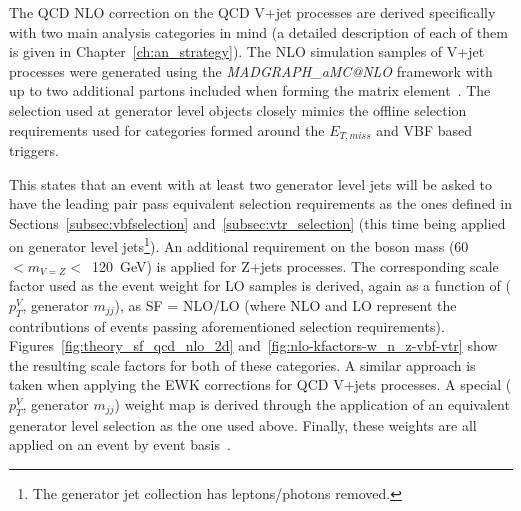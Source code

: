 \hspace{10pt} The QCD NLO correction on the QCD V+jet processes are derived specifically with two main analysis categories in mind (a detailed description of each of them is given in Chapter~\ref{ch:an_strategy}). The NLO simulation samples of V+jet processes were generated using the \emph{MADGRAPH\_aMC@NLO} framework with up to two additional partons included when forming the matrix element~\cite{note:AN_19_257}. The selection used at generator level objects closely mimics the offline selection requirements used for categories formed around the $E_{T,miss}$ and VBF based triggers.

\hspace{10pt} This states that an event with at least two generator level jets will be asked to have the leading pair pass equivalent selection requirements as the ones defined in Sections~\ref{subsec:vbfselection} and~\ref{subsec:vtr_selection} (this time being applied on generator level jets\footnote{The generator jet collection has leptons/photons removed.}). An additional requirement on the boson mass (60~$<m_{V=Z}<$~120~GeV) is applied for Z+jets processes. The corresponding scale factor used as the event weight for LO samples is derived, again as a function of ($p_T^{V}$, generator $m_{jj}$), as SF = NLO/LO (where NLO and LO represent the contributions of events passing aforementioned selection requirements). Figures~\ref{fig:theory_sf_qcd_nlo_2d} and~\ref{fig:nlo-kfactors-w_n_z-vbf-vtr} show the resulting scale factors for both of these categories. A similar approach is taken when applying the EWK corrections for QCD V+jets processes. A special ($p_T^{V}$, generator $m_{jj}$) weight map is derived through the application of an equivalent generator level selection as the one used above. Finally, these weights are all applied on an event by event basis~\cite{note:AN_19_257}.

